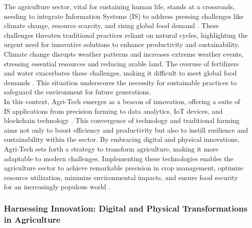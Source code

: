\documentclass[12pt,a4paper]{article}
\begin{document}
The agriculture sector, vital for sustaining human life, stands at a crossroads, needing to integrate Information Systems (IS) to address pressing challenges like climate change, resource scarcity, and rising global food demand \citep{Ref_1}. These challenges threaten traditional practices reliant on natural cycles, highlighting the urgent need for innovative solutions to enhance productivity and sustainability.\\

\noindent Climate change disrupts weather patterns and increases extreme weather events, stressing essential resources and reducing arable land. The overuse of fertilizers and water exacerbates these challenges, making it difficult to meet global food demands \citep{Ref_2}. This situation underscores the necessity for sustainable practices to safeguard the environment for future generations.\\

\noindent In this context, Agri-Tech emerges as a beacon of innovation, offering a suite of IS applications from precision farming to data analytics, IoT devices, and blockchain technology \citep{Ref_3}. This convergence of technology and traditional farming aims not only to boost efficiency and productivity but also to instill resilience and sustainability within the sector. By embracing digital and physical innovations, Agri-Tech sets forth a strategy to transform agriculture, making it more adaptable to modern challenges. Implementing these technologies enables the agriculture sector to achieve remarkable precision in crop management, optimize resource utilization, minimize environmental impacts, and ensure food security for an increasingly populous world \citep{Ref_3}.
\\

\subsubsection{Harnessing Innovation: Digital and Physical Transformations in Agriculture}
\end{document}
